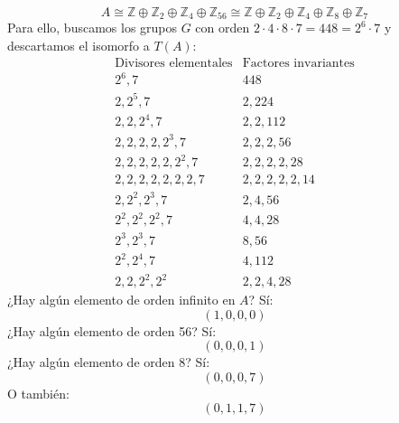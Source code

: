 \begin{ejemplo}
\begin{equation*}
        A \cong \mathbb{Z} \oplus \mathbb{Z}_2\oplus \mathbb{Z}_4 \oplus \mathbb{Z}_{56} \cong \mathbb{Z} \oplus \mathbb{Z}_2 \oplus \mathbb{Z}_4 \oplus \mathbb{Z}_8 \oplus \mathbb{Z}_7
    \end{equation*}
    Para ello, buscamos los grupos $G$ con orden $2\cdot 4\cdot 8\cdot 7 = 448 = 2^{6}\cdot 7$ y descartamos el isomorfo a $T(A)$:
    \begin{equation*}
        \begin{array}{c|c}
            \text{Divisores elementales} & \text{Factores invariantes} \\
            \hline
            2^6, 7 & 448 \\
            2, 2^5, 7 & 2, 224 \\
            2, 2, 2^4, 7 & 2, 2, 112\\
            2, 2, 2, 2, 2^3, 7 & 2, 2, 2, 56\\
            2, 2, 2, 2, 2, 2^2, 7 & 2, 2, 2, 2, 28 \\
            2, 2, 2, 2, 2, 2, 2, 7 & 2, 2, 2, 2, 2, 14 \\
            2, 2^2, 2^3, 7 & 2, 4, 56\\
            2^2, 2^2, 2^2, 7 & 4, 4, 28 \\
            2^3, 2^3, 7 & 8, 56 \\
            2^2, 2^4, 7 & 4, 112\\
            2, 2, 2^2, 2^2  & 2, 2, 4, 28
        \end{array}
    \end{equation*}
    ¿Hay algún elemento de orden infinito en $A$? Sí:
    \begin{equation*}
        (1, 0, 0, 0)
    \end{equation*}
    ¿Hay algún elemento de orden 56? Sí:
    \begin{equation*}
        (0, 0, 0, 1)
    \end{equation*}
    ¿Hay algún elemento de orden 8? Sí:
    \begin{equation*}
        (0, 0, 0, 7)
    \end{equation*}
    O también:
    \begin{equation*}
        (0, 1, 1, 7)
    \end{equation*}
\end{ejemplo}

